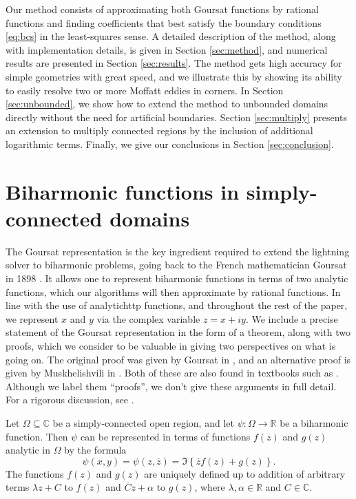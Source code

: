 \documentclass{article}
\newcommand{\reals}{\mathbb{R}}
\newcommand{\conj}[1]{{\overline{#1}}}
\begin{document}
Our method consists of approximating both Goursat functions by rational
functions and finding coefficients that best satisfy the boundary conditions
\eqref{eq:bcs} in the least-squares sense. A detailed description of the
method, along with implementation details, is given in Section
\ref{sec:method}, and numerical results are presented in Section
\ref{sec:results}. The method gets high accuracy for simple geometries with
great speed, and we illustrate this by showing its ability to easily resolve
two or more Moffatt eddies in corners. In Section \ref{sec:unbounded}, we show
how to extend the method to unbounded domains directly without the need for
artificial boundaries. Section  \ref{sec:multiply} presents an extension to
multiply connected regions by the inclusion of additional logarithmic terms.
Finally, we give our conclusions in Section \ref{sec:conclusion}.

\section{Biharmonic functions in simply-connected domains \label{sec:goursat}}

The Goursat representation is the key ingredient required to extend the
lightning solver to biharmonic problems, going back to the French mathematician
Goursat in 1898 \cite{goursat98}. It allows one to represent biharmonic
functions in terms of two analytic functions, which our algorithms will then
approximate by rational functions. In line with the use of analytichttp
functions, and throughout the rest of the paper, we represent $x$ and $y$ via
the complex variable $z = x + iy$. We include a precise statement of the
Goursat representation in the form of a theorem, along with two proofs, which
we consider to be valuable in giving two perspectives on what is going on. The
original proof was given by Goursat in \cite{goursat98}, and an alternative
proof is given by Muskhelishvili in \cite{musk19}. Both of these are also found
in textbooks such as \cite{carrier05,musk77}. Although we label them
``proofs'', we don’t give these arguments in full detail. For a rigorous
discussion, see \cite{musk77}.


\begin{theorem}
\label{th:goursat}
Let $\Omega\subseteq\mathbb{C}$ be a simply-connected open region, and let
$\psi : \Omega \to \reals$ be a biharmonic function. Then $\psi$ can
be represented in terms of functions $f(z)$ and $g(z)$ analytic in $\Omega$
by the formula
\begin{equation}\label{eq:goursat}
\psi(x,y) = \psi(z,\conj{z}) = \Im \left\{ \conj{z}f(z) + g(z)\right\}.
\end{equation}
The functions $f(z)$ and $g(z)$ are uniquely defined up to addition of
arbitrary terms $\lambda z+C$ to $f(z)$ and $\conj{C}z+\alpha$ to $g(z)$,
where $\lambda,\alpha\in\reals$ and $C\in\mathbb{C}$.
\end{theorem}
\end{document}
